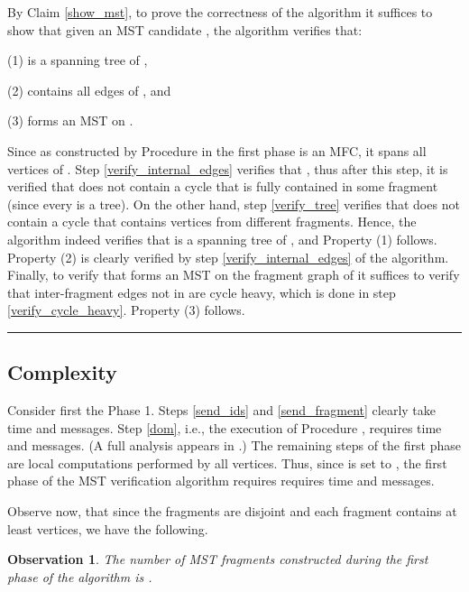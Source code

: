 \documentclass[11pt,letter]{article}
\newtheorem{observation}[theorem]{Observation}
\newcommand{\qed}{\rule{7pt}{7pt}}
\newenvironment{proof}{\noindent{\bf Proof}\hspace*{1em}}{\qed\bigskip}
\begin{document}
\begin{proof} 
By Claim \ref{show_mst}, to prove the correctness of the algorithm it suffices 
to show that given an MST candidate , the algorithm  verifies that: 
\begin{description}
\item{(1)}  is a spanning tree of ,
\item{(2)}  contains all edges of , and
\item{(3)}  forms an MST on  .
\end{description}

Since  as constructed by Procedure  
in the first phase is an MFC, it spans all vertices of . 
Step \ref{verify_internal_edges} verifies that 
, 
thus after this step, it is verified that  does not contain a cycle that 
is fully contained in some fragment  (since every  
is a tree). On the other hand, step \ref{verify_tree} verifies that  
does not contain a cycle that contains vertices from different fragments. 
Hence, the algorithm indeed verifies that  is a spanning tree of , 
and Property (1) follows. 
Property (2) is clearly verified by step \ref{verify_internal_edges} of the algorithm.
Finally, to verify that  forms an MST on the fragment graph 
of  it suffices to verify that inter-fragment edges not in  
are cycle heavy, which is done in step \ref{verify_cycle_heavy}.
Property (3) follows.
\end{proof}

\subsection{Complexity}

Consider first the Phase 1. Steps \ref{send_ids} and \ref{send_fragment} clearly take  time and  messages.
Step \ref{dom}, i.e., the execution of 
Procedure , requires  time and 
 messages. 
(A full analysis appears in \cite{Vitaly}.) 
The remaining steps of the first phase are local computations performed by 
all vertices. Thus, since  is set to ,
the first phase of the MST verification algorithm requires 
requires  time and 
 messages.


Observe now, that since the fragments are disjoint and each fragment contains at least  vertices, 
we have the following.
\begin{observation} 
\label{num_of_fragments}
The number of MST fragments constructed during the first phase of the 
algorithm is . 
\end{observation} 
\end{document}
